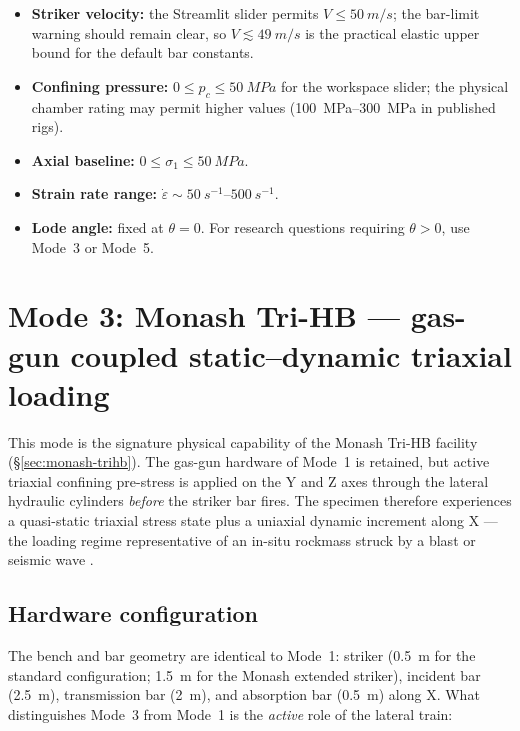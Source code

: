 \documentclass[11pt,a4paper,openany]{book}
\providecommand{\SI}[2]{\qty{#1}{#2}}
\providecommand{\SIrange}[3]{\qtyrange{#1}{#2}{#3}}
\theoremstyle{handbook}
\newcommand{\sig}{\sigma}
\newcommand{\eps}{\varepsilon}
\newcommand{\epsdot}{\dot\eps}
\begin{document}
\begin{itemize}[leftmargin=*]
  \item \textbf{Striker velocity:} the Streamlit slider permits
        $V\le\SI{50}{m/s}$; the bar-limit warning should remain clear, so
        $V\lesssim\SI{49}{m/s}$ is the practical elastic upper bound for
        the default bar constants.
  \item \textbf{Confining pressure:} $0\le p_c\le\SI{50}{MPa}$ for the
        workspace slider; the physical chamber rating may permit
        higher values (\SIrange{100}{300}{MPa} in published rigs).
  \item \textbf{Axial baseline:} $0\le\sig_1\le\SI{50}{MPa}$.
  \item \textbf{Strain rate range:} $\epsdot\sim\SIrange{50}{500}{s^{-1}}$.
  \item \textbf{Lode angle:} fixed at $\theta=0$. For research questions
        requiring $\theta>0$, use Mode~3 or Mode~5.
\end{itemize}


\chapter{Mode 3: Monash Tri-HB --- gas-gun coupled static--dynamic triaxial loading}\label{ch:mode3}

This mode is the signature physical capability of the Monash Tri-HB
facility (\S\ref{sec:monash-trihb}). The gas-gun hardware of Mode~1 is
retained, but active triaxial confining pre-stress is applied on the Y and Z
axes through the lateral hydraulic cylinders \emph{before} the striker bar
fires. The specimen therefore experiences a quasi-static triaxial stress
state plus a uniaxial dynamic increment along X --- the loading regime
representative of an in-situ rockmass struck by a blast or seismic wave
\cite{Liu2019,Zhang2019Tri}.

\section{Hardware configuration}

The bench and bar geometry are identical to Mode~1: striker
(\SI{0.5}{m} for the standard configuration; \SI{1.5}{m} for the Monash
extended striker), incident bar (\SI{2.5}{m}), transmission bar (\SI{2}{m}),
and absorption bar (\SI{0.5}{m}) along X. What distinguishes Mode~3 from
Mode~1 is the \emph{active} role of the lateral train:
\end{document}
